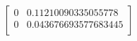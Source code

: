 \documentclass[landscape]{article}
\begin{document}
    \begin{equation}
        \left[
        \begin{array}{cc}
        0 & 0.11210090335055778 \\
        0 & 0.043676693577683445 \\
        \end{array}
        \right]
        \end{equation}
\end{document}

